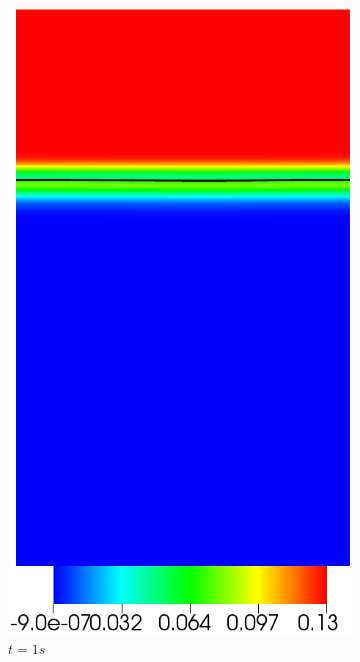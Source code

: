 \begin{figure}[H]
	\centering
	\begin{subfigure}[ht!]{0.2\textwidth}
		\centering
		\includegraphics[width=1\textwidth]{figure/PT_RT/concent0/visit0007.png}
		\caption{$t=1s$}
	\end{subfigure}
	\begin{subfigure}[ht!]{0.2\textwidth}
		\centering

\end{subfigure}
\end{figure}
